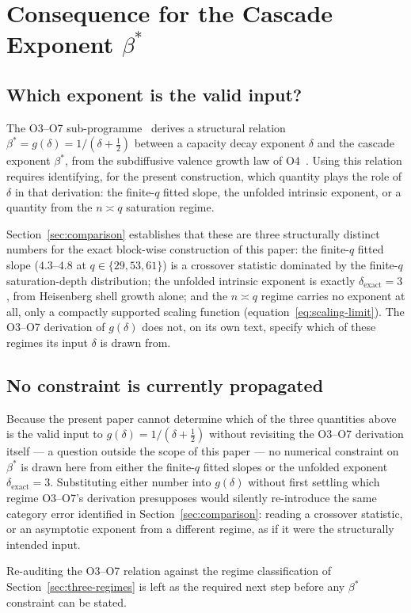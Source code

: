 \section{Consequence for the Cascade Exponent $\beta^*$}
  \label{sec:beta}

  \subsection{Which exponent is the valid input?}

    The O3--O7 sub-programme~\cite{Beau2026a7,Beau2026a8,Beau2026a9,Beau2026a10,Beau2026a11}
    derives a structural relation $\beta^*=g(\delta)=1/(\delta+\tfrac12)$ between a capacity
    decay exponent $\delta$ and the cascade exponent $\beta^*$, from the subdiffusive valence
    growth law of O4~\cite{Beau2026a8}.
    Using this relation requires identifying, for the present construction, which quantity
    plays the role of $\delta$ in that derivation: the finite-$q$ fitted slope, the unfolded
    intrinsic exponent, or a quantity from the $n\asymp q$ saturation regime.

    Section~\ref{sec:comparison} establishes that these are three structurally distinct
    numbers for the exact block-wise construction of this paper: the finite-$q$ fitted slope
    ($4.3$--$4.8$ at $q\in\{29,53,61\}$) is a crossover statistic dominated by the
    finite-$q$ saturation-depth distribution; the unfolded intrinsic exponent is exactly
    $\delta_{\mathrm{exact}}=3$, from Heisenberg shell growth alone; and the $n\asymp q$ regime
    carries no exponent at all, only a compactly supported scaling function
    (equation~\eqref{eq:scaling-limit}).
    The O3--O7 derivation of $g(\delta)$ does not, on its own text, specify which of these
    regimes its input $\delta$ is drawn from.

  \subsection{No constraint is currently propagated}

    Because the present paper cannot determine which of the three quantities above is the
    valid input to $g(\delta)=1/(\delta+\tfrac12)$ without revisiting the O3--O7 derivation
    itself — a question outside the scope of this paper — no numerical constraint on
    $\beta^*$ is drawn here from either the finite-$q$ fitted slopes or the unfolded exponent
    $\delta_{\mathrm{exact}}=3$.
    Substituting either number into $g(\delta)$ without first settling which regime O3--O7's
    derivation presupposes would silently re-introduce the same category error identified in
    Section~\ref{sec:comparison}: reading a crossover statistic, or an asymptotic exponent
    from a different regime, as if it were the structurally intended input.

    Re-auditing the O3--O7 relation against the regime classification of
    Section~\ref{sec:three-regimes} is left as the required next step before any
    $\beta^*$ constraint can be stated.
